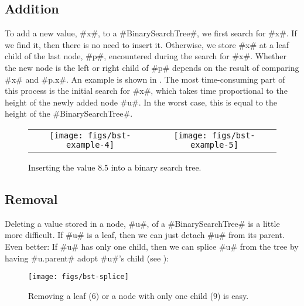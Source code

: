 \subsection{Addition}

To add a new value, #x#, to a #BinarySearchTree#, we first search for
#x#. If we find it, then there is no need to insert it.  Otherwise,
we store #x# at a leaf child of the last node, #p#, encountered during the
search for #x#. Whether the new node is the left or right child of #p# depends on the result of comparing #x# and #p.x#.
An example is shown in . The most time-consuming
part of this process is the initial search for #x#, which takes time
proportional to the height of the newly added node #u#.  In the worst
case, this is equal to the height of the #BinarySearchTree#.


\begin{figure}
  \begin{center}
    \begin{tabular}{cc}
    \texttt{[image: figs/bst-example-4]} &
    \texttt{[image: figs/bst-example-5]} 
    \end{tabular}
  \end{center}
  \caption{Inserting the value $8.5$ into a binary search tree.}
\end{figure}


\subsection{Removal}

Deleting a value stored in a node, #u#, of a #BinarySearchTree# is a
little more difficult.  If #u# is a leaf, then we can just detach #u#
from its parent.  Even better: If #u# has only one child, then we can
splice #u# from the tree by having #u.parent# adopt #u#'s child (see
):

\begin{figure}
  \begin{center}
    \texttt{[image: figs/bst-splice]}
  \end{center}
  \caption{Removing a leaf ($6$) or a node with only one child ($9$) is easy.}
\end{figure}

